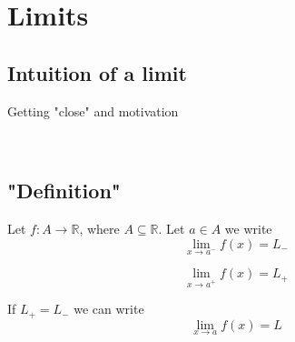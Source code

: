 \documentclass[20pt]{extarticle}
\newcommand{\R}{\mathbb{R}}
\begin{document}


\section*{\textbf{\color{draculaorange}Limits}}

\subsection*{\textbf{\color{draculaorange}Intuition of a limit}}

Getting "close" and motivation

\newpage
\(\)
\newpage
\(\)
\newpage

\subsection*{\textbf{\color{draculaorange} "Definition"}}
Let \(f:A\to \R\), where \(A\subseteq \R\). Let \(a\in A\)
we write
\[\lim_{x\to a^-} f(x)=L_-\]

\[\lim_{x\to a^+} f(x)=L_+\]

If \(L_+=L_-\) we can write
\[\lim_{x\to a} f(x)=L\]

\newpage
\end{document}
